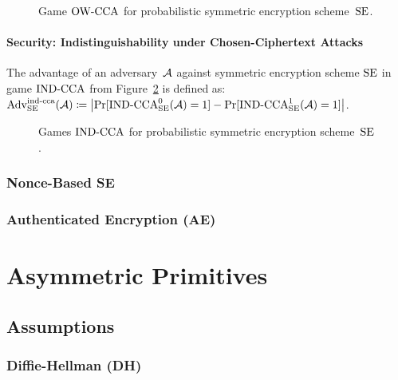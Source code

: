 \documentclass[a4paper,orivec]{llncs}
\begin{document}
\begin{figure}[!ht]
    \centering
    \nicoresetlinenr%
    \fbox{%
        \scalebox{\codescalefactor}{%
        }%
    }
    \caption{%
        Game ${\mathrm{OW}\text{-}\mathrm{CCA}}$ for probabilistic symmetric encryption scheme~$\mathrm{SE}$.
    }
    \label{fig:sym:enc:ow:prob}
\end{figure}

\paragraph{Security: Indistinguishability under Chosen-Ciphertext Attacks}
The advantage of an adversary~$\mathcal{A}$ against symmetric encryption scheme $\mathrm{SE}$ in game ${\mathrm{IND}\text{-}\mathrm{CCA}}$ from Figure~\ref{fig:sym:enc:ind:prob} is defined as:\\
$\mathrm{Adv}_{\mathrm{SE}}^{\mathrm{ind}\text{-}\mathrm{cca}}(\mathcal{A})\coloneqq\left|\Pr[{\mathrm{IND}\text{-}\mathrm{CCA}}_{\mathrm{SE}}^0(\mathcal{A})=1]-\Pr[{\mathrm{IND}\text{-}\mathrm{CCA}}_{\mathrm{SE}}^1(\mathcal{A})=1]\right|$.

\begin{figure}[!ht]
    \centering
    \nicoresetlinenr%
    \fbox{%
        \scalebox{\codescalefactor}{%
        }%
    }
    \caption{%
        Games ${\mathrm{IND}\text{-}\mathrm{CCA}}$ for probabilistic symmetric encryption scheme~$\mathrm{SE}$.
    }
    \label{fig:sym:enc:ind:prob}
\end{figure}


\subsubsection{Nonce-Based SE}


\subsubsection{Authenticated Encryption (AE)}



\section{Asymmetric Primitives}


\subsection{Assumptions}

\subsubsection{Diffie-Hellman (DH)}
\end{document}
